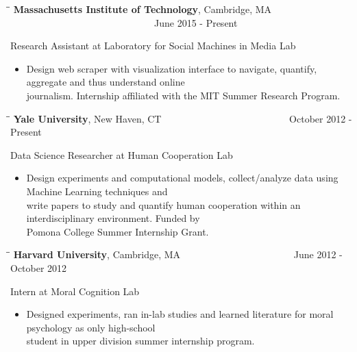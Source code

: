 \documentclass{res}
\begin{document}
\begin{resume}
   \vspace{-0.3in}	
     \begin{tabbing}
     	\hspace{2.3in}\= \hspace{2.6in}\= \kill %
     	{\bf Massachusetts Institute of Technology}, Cambridge, MA    \>     \>~~~~~~~~~~~~~~~~~~~~~~~~~~~~~~June 2015 - Present
     \end{tabbing}\vspace{-20pt}      %
     Research Assistant at Laboratory for Social Machines in Media Lab\\
     \vspace{-0.15in}	
     \begin{itemize}
     	\item Design web scraper with visualization interface to navigate, quantify, aggregate and thus understand online\\ journalism. Internship affiliated with the MIT Summer Research Program.
     \end{itemize}
     \vspace{-0.2in}	
   \begin{tabbing}
   \hspace{2.3in}\= \hspace{2.6in}\= \kill %
    {\bf Yale University}, New Haven, CT    \>     \>~~~~~~~~~~~~~~~~~~~~~~~~~~October 2012 - Present
   \end{tabbing}\vspace{-20pt}      %
   Data Science Researcher at Human Cooperation Lab\\
     \vspace{-0.15in}	
    \begin{itemize}
\item Design experiments and computational models, collect/analyze data using Machine Learning techniques and\\ write papers to study and quantify human cooperation within an interdisciplinary environment. Funded by\\ Pomona College Summer Internship Grant.
\end{itemize}
     \vspace{-0.2in}	
   \begin{tabbing}
   \hspace{2.3in}\= \hspace{2.6in}\= \kill %
    {\bf Harvard University}, Cambridge, MA \>   \>~~~~~~~~~~~~~~~~~~~~~~~June 2012 - October 2012             
   \end{tabbing}\vspace{-20pt}
    Intern at Moral Cognition Lab\\
    \vspace{-0.15in}	
\begin{itemize}
\item Designed experiments, ran in-lab studies and learned literature for moral psychology as only high-school \\student in upper division summer  internship program. \end{itemize}
  

\end{resume}
\end{document}
